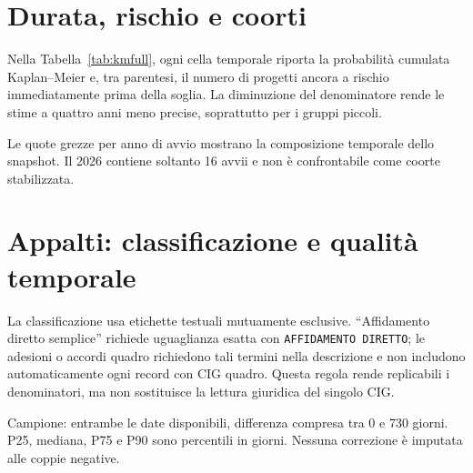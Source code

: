 \documentclass[10pt,a4paper]{article}
\begin{document}
\section{Durata, rischio e coorti}

Nella Tabella~\ref{tab:kmfull}, ogni cella temporale riporta la probabilità cumulata Kaplan--Meier e, tra parentesi, il numero di progetti ancora a rischio immediatamente prima della soglia. La diminuzione del denominatore rende le stime a quattro anni meno precise, soprattutto per i gruppi piccoli.

\begin{table}[H]
\centering
\caption{Conclusione cumulata registrata e numerosità a rischio}
\label{tab:kmfull}
\resizebox{\textwidth}{!}{}
\end{table}

Le quote grezze per anno di avvio mostrano la composizione temporale dello snapshot. Il 2026 contiene soltanto 16 avvii e non è confrontabile come coorte stabilizzata.

\begin{table}[H]
\centering
\caption{Avanzamento per coorte di avvio effettivo}
\resizebox{0.78\textwidth}{!}{}
\end{table}

\section{Appalti: classificazione e qualità temporale}

La classificazione usa etichette testuali mutuamente esclusive. \textquotedblleft{}Affidamento diretto semplice\textquotedblright{} richiede uguaglianza esatta con \texttt{AFFIDAMENTO DIRETTO}; le adesioni o accordi quadro richiedono tali termini nella descrizione e non includono automaticamente ogni record con CIG quadro. Questa regola rende replicabili i denominatori, ma non sostituisce la lettura giuridica del singolo CIG.

\begin{table}[H]
\centering
\caption{Esito del controllo sulle date di pubblicazione e aggiudicazione}
\resizebox{0.78\textwidth}{!}{}
\end{table}

\begin{table}[H]
\centering
\caption{Giorni tra pubblicazione e aggiudicazione, coppie utilizzabili}
\resizebox{\textwidth}{!}{}
\begin{minipage}{0.96\textwidth}\footnotesize\color{dvnsgrey}
Campione: entrambe le date disponibili, differenza compresa tra 0 e 730 giorni. P25, mediana, P75 e P90 sono percentili in giorni. Nessuna correzione è imputata alle coppie negative.
\end{minipage}
\end{table}
\end{document}
